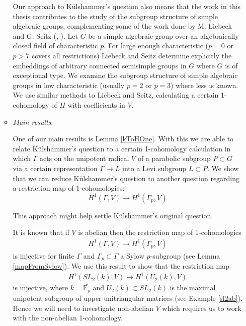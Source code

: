 \begin{itemize}
\begin{itemize}
		
		Our approach to K\"ulshammer's question also means that the work in this thesis contributes to the study of the subgroup structure of simple algebraic groups, complementing some of the work done by M. Liebeck and G. Seitz (\cite{liebeck1996reductive}, \cite{liebeck2004maximal}). Let $G$ be a simple algebraic group over an algebraically closed field of characteristic $p$. For large enough characteristic ($p=0$ or $p>7$ covers all restrictions) Liebeck and Seitz determine explicitly the embeddings of arbitrary connected semisimple groups in $G$ where $G$ is of exceptional type. We examine the subgroup structure of simple algebraic groups in low characteristic (usually $p=2$ or $p=3$) where less is known. We use similar methods to Liebeck and Seitz, calculating a certain 1-cohomology of $H$ with coefficients in $V$.
		
		

		\item \emph{Main results}:
		
		
		One of our main results is Lemma \ref{kToHOne}. With this we are able to relate K\"ulshammer's question to a certain 1-cohomology calculation in which $\Gamma$ acts on the unipotent radical $V$ of a parabolic subgroup $P \subset G$ via a certain representation $\Gamma \rightarrow L$ into a Levi subgroup $L \subset P$. We show that we can reduce K\"ulshammer's question to another question regarding a restriction map of 1-cohomologies:
		\begin{displaymath}
			H^1(\Gamma, V) \rightarrow H^1(\Gamma_p, V)
		\end{displaymath}
		
		
		This approach might help settle K\"ulshammer's original question.
		
		
		It is known that if $V$ is abelian then the restriction map of 1-cohomologies
		\begin{eqnarray*}
			H^1(\Gamma, V)\rightarrow H^1(\Gamma_p, V)
		\end{eqnarray*}
		is injective for finite $\Gamma$ and $\Gamma_p\subset\Gamma$ a Sylow $p$-subgroup (see Lemma \ref{mapFromSylow}). We use this result to show that the restriction map
		\begin{eqnarray*}
			H^1(SL_2(k), V) \rightarrow H^1(U_2(k), V)
		\end{eqnarray*}
		is injective, where $k = \bar{\mathbb{F}_p}$ and $U_2(k)\subset SL_2(k)$ is the maximal unipotent subgroup of upper unitriangular matrices (see Example \ref{sl2ab}). Hence we will need to investigate non-abelian $V$ which requires us to work with the non-abelian 1-cohomology.



\end{itemize}
\end{itemize}

